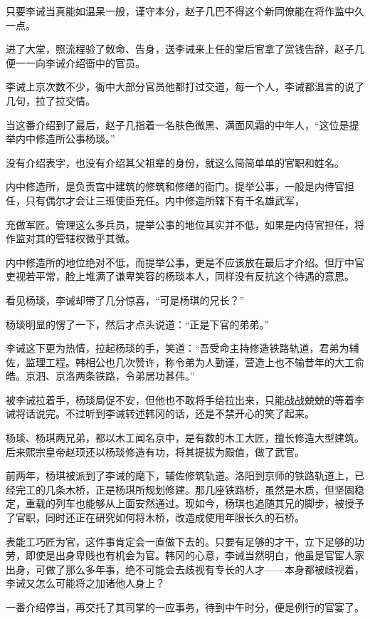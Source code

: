 只要李诫当真能如温杲一般，谨守本分，赵子几巴不得这个新同僚能在将作监中久一点。

进了大堂，照流程验了敇命、告身，送李诫来上任的堂后官拿了赏钱告辞，赵子几便一一向李诫介绍衙中的官员。

李诫上京次数不少，衙中大部分官员他都打过交道，每一个人，李诫都温言的说了几句，拉了拉交情。

当这番介绍到了最后，赵子几指着一名肤色微黑、满面风霜的中年人，“这位是提举内中修造所公事杨琰。”

没有介绍表字，也没有介绍其父祖辈的身份，就这么简简单单的官职和姓名。

内中修造所，是负责宫中建筑的修筑和修缮的衙门。提举公事，一般是内侍官担任，只有偶尔才会让三班使臣充任。内中修造所辖下有千名雄武军，

充做军匠。管理这么多兵员，提举公事的地位其实并不低，如果是内侍官担任，将作监对其的管辖权微乎其微。

内中修造所的地位绝对不低，而提举公事，更是不应该放在最后才介绍。但厅中官吏视若平常，脸上堆满了谦卑笑容的杨琰本人，同样没有反抗这个待遇的意思。

看见杨琰，李诫却带了几分惊喜，“可是杨琪的兄长？”

杨琰明显的愣了一下，然后才点头说道：“正是下官的弟弟。”

李诫这下更为热情，拉起杨琰的手，笑道：“吾受命主持修造铁路轨道，君弟为辅佐，监理工程。韩相公也几次赞许，称令弟为人勤谨，营造上也不输昔年的大工俞皓。京泗、京洛两条铁路，令弟居功甚伟。”

被李诫拉着手，杨琰局促不安，但他也不敢将手给拉出来，只能战战兢兢的等着李诫将话说完。不过听到李诫转述韩冈的话，还是不禁开心的笑了起来。

杨琰、杨琪两兄弟，都以木工闻名京中，是有数的木工大匠，擅长修造大型建筑。后来熙宗皇帝赵顼还以杨琰修造有功，将其提拔为殿值，做了武官。

前两年，杨琪被派到了李诫的麾下，辅佐修筑轨道。洛阳到京师的铁路轨道上，已经完工的几条木桥，正是杨琪所规划修建。那几座铁路桥，虽然是木质，但坚固稳定，重载的列车也能够从上面安然通过。现如今，杨琪也追随其兄的脚步，被授予了官职，同时还正在研究如何将木桥，改造成使用年限长久的石桥。

表能工巧匠为官，这件事肯定会一直做下去的。只要有足够的才干，立下足够的功劳，即使是出身卑贱也有机会为官。韩冈的心意，李诫当然明白，他虽是官宦人家出身，可做了那么多年事，绝不可能会去歧视有专长的人才——本身都被歧视着，李诫又怎么可能将之加诸他人身上？

一番介绍停当，再交托了其司掌的一应事务，待到中午时分，便是例行的官宴了。

